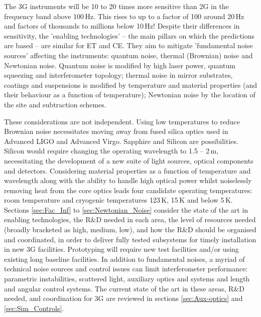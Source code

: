 The 3G instruments will be 10 to 20 times more sensitive than 2G in the frequency band above  100\,Hz.  This rises to up to a factor of 100 around 20\,Hz and factors of thousands to millions below 10\,Hz!  Despite their differences in sensitivity, the 'enabling technologies' -- the main pillars on which the predictions are based --  are similar for ET and CE. They aim to mitigate 'fundamental noise sources' affecting the instruments:  quantum noise, thermal (Brownian) noise and Newtonian noise. 
Quantum noise is modified by high laser power, quantum squeezing and interferometer topology; thermal noise in mirror substrates, coatings and suspensions is modified by temperature and material properties (and their behaviour as a function of temperature); Newtonian noise by the location of the site and subtraction schemes.  

These considerations are not independent. Using low temperatures to reduce Brownian noise necessitates moving away from fused silica optics used in Advanced LIGO and Advanced Virgo. Sapphire and Silicon are possibilities. Silicon would require changing the operating wavelength to 1.5 -- 2\,\micro m, necessitating the development of a new suite of light sources, optical components and detectors.  Considering material properties as a function of temperature and wavelength along with the ability to handle high optical power whilst noiselessly removing heat from the core optics leads four candidate operating temperatures:  room temperature and cryogenic temperatures 123\,K, 15\,K and below 5\,K.  Sections \ref{sec:Fac_Inf} to \ref{sec:Newtonian_Noise} consider the state of the art in enabling technologies, the R\&D needed in each area, the level of resources needed (broadly bracketed as high, medium, low), and how the R\&D should be organised and coordinated, in order to deliver fully tested subsystems for  timely installation in new 3G facilities. Prototyping will require new test facilities and/or using existing long baseline facilities.
In addition to fundamental noises, a myriad of technical noise sources and control issues can limit interferometer performance:  parametric instabilities, scattered light, auxiliary optics and systems and length and angular control systems.  The current state of the art in these areas, R\&D needed, and coordination for 3G are reviewed in sections \ref{sec:Aux-optics} and \ref{sec:Sim_Controls}. 

